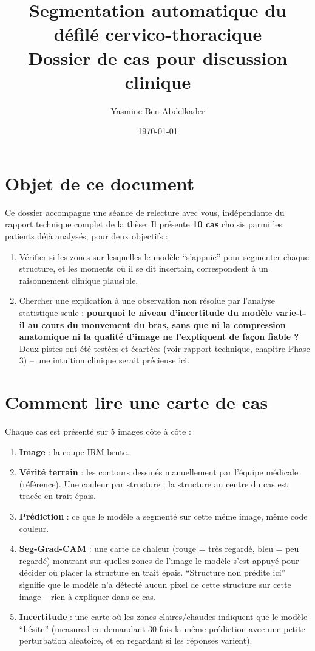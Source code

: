 \documentclass[11pt,a4paper]{article}
\title{Segmentation automatique du défilé cervico-thoracique \\
\large Dossier de cas pour discussion clinique}
\author{Yasmine Ben Abdelkader}
\date{\today}
\begin{document}
\maketitle

\section*{Objet de ce document}

Ce dossier accompagne une séance de relecture avec vous, indépendante du rapport
technique complet de la thèse. Il présente \textbf{10 cas} choisis parmi les
patients déjà analysés, pour deux objectifs :

\begin{enumerate}[nosep]
    \item Vérifier si les zones sur lesquelles le modèle ``s'appuie'' pour
        segmenter chaque structure, et les moments où il se dit incertain,
        correspondent à un raisonnement clinique plausible.
    \item Chercher une explication à une observation non résolue par l'analyse
        statistique seule : \textbf{pourquoi le niveau d'incertitude du modèle
        varie-t-il au cours du mouvement du bras, sans que ni la compression
        anatomique ni la qualité d'image ne l'expliquent de façon fiable ?} Deux
        pistes ont été testées et écartées (voir rapport technique, chapitre Phase
        3) -- une intuition clinique serait précieuse ici.
\end{enumerate}

\section*{Comment lire une carte de cas}

Chaque cas est présenté sur 5 images côte à côte :

\begin{enumerate}[nosep]
    \item \textbf{Image} : la coupe IRM brute.
    \item \textbf{Vérité terrain} : les contours dessinés manuellement par
        l'équipe médicale (référence). Une couleur par structure ; la structure
        au centre du cas est tracée en trait épais.
    \item \textbf{Prédiction} : ce que le modèle a segmenté sur cette même image,
        même code couleur.
    \item \textbf{Seg-Grad-CAM} : une carte de chaleur (rouge = très regardé, bleu
        = peu regardé) montrant sur quelles zones de l'image le modèle s'est appuyé
        pour décider où placer la structure en trait épais. ``Structure non prédite
        ici'' signifie que le modèle n'a détecté aucun pixel de cette structure sur
        cette image -- rien à expliquer dans ce cas.
    \item \textbf{Incertitude} : une carte où les zones claires/chaudes indiquent
        que le modèle ``hésite'' (measured en demandant 30 fois la même prédiction
        avec une petite perturbation aléatoire, et en regardant si les réponses
        varient).
\end{enumerate}
\end{document}
